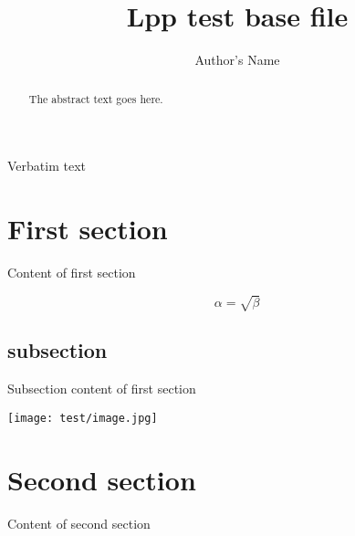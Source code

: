 \documentclass{article}
\begin{document}
\title{Lpp test base file}
\author{Author's Name}

\maketitle

\begin{abstract}
The abstract text goes here.
\end{abstract}

Verbatim text

\section{First section}
Content of first section

\begin{equation}
    \label{simple_equation}
    \alpha = \sqrt{ \beta }
\end{equation}


\subsection{subsection}
Subsection content of first section

\texttt{[image: test/image.jpg]}

\section{Second section}
Content of second section
\end{document}
